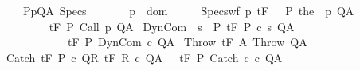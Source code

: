 \begin{isabellebody}
\ \ \ \ {\isasymforall}{\isacharparenleft}P{\isacharcomma}p{\isacharcomma}Q{\isacharcomma}A{\isacharparenright}{\isasymin}\ Specs{\isachardot}\ \isanewline
\ \ \ \ \ \ p\ {\isasymin}\ dom\ {\isasymGamma}\ {\isasymand}\ {\isacharparenleft}{\isasymforall}{\isasymsigma}{\isachardot}\ {\isasymGamma}{\isacharcomma}{\isasymTheta}\ {\isasymunion}\ Specs{\isacharunderscore}wf\ p\ {\isasymsigma}{\isasymturnstile}\isactrlsub t\isactrlbsub {\isacharslash}F\isactrlesub \ {\isacharparenleft}{\isacharbraceleft}{\isasymsigma}{\isacharbraceright}\ {\isasyminter}\ P{\isacharparenright}\ {\isacharparenleft}the\ {\isacharparenleft}{\isasymGamma}\ p{\isacharparenright}{\isacharparenright}\ Q{\isacharcomma}A{\isacharparenright}\isanewline
\ \ \ \ {\isasymrbrakk}\isanewline
\ \ \ \ {\isasymLongrightarrow}\isanewline
\ \ \ \ {\isasymGamma}{\isacharcomma}{\isasymTheta}{\isasymturnstile}\isactrlsub t\isactrlbsub {\isacharslash}F\isactrlesub \ P\ {\isacharparenleft}Call\ p{\isacharparenright}\ Q{\isacharcomma}A{\isachardoublequoteclose}\isanewline
\isanewline
\isanewline
{\isacharbar}\ DynCom{\isacharcolon}\ \ {\isachardoublequoteopen}{\isasymforall}s\ {\isasymin}\ P{\isachardot}\ {\isasymGamma}{\isacharcomma}{\isasymTheta}{\isasymturnstile}\isactrlsub t\isactrlbsub {\isacharslash}F\isactrlesub \ P\ {\isacharparenleft}c\ s{\isacharparenright}\ Q{\isacharcomma}A\ \isanewline
\ \ \ \ \ \ \ \ \ \ \ \ {\isasymLongrightarrow}\ \isanewline
\ \ \ \ \ \ \ \ \ \ \ \ {\isasymGamma}{\isacharcomma}{\isasymTheta}{\isasymturnstile}\isactrlsub t\isactrlbsub {\isacharslash}F\isactrlesub \ P\ {\isacharparenleft}DynCom\ c{\isacharparenright}\ Q{\isacharcomma}A{\isachardoublequoteclose}\isanewline
\isanewline
\isanewline
{\isacharbar}\ Throw{\isacharcolon}\ {\isachardoublequoteopen}{\isasymGamma}{\isacharcomma}{\isasymTheta}{\isasymturnstile}\isactrlsub t\isactrlbsub {\isacharslash}F\isactrlesub \ A\ Throw\ Q{\isacharcomma}A{\isachardoublequoteclose}\isanewline
\isanewline
{\isacharbar}\ Catch{\isacharcolon}\ {\isachardoublequoteopen}{\isasymlbrakk}{\isasymGamma}{\isacharcomma}{\isasymTheta}{\isasymturnstile}\isactrlsub t\isactrlbsub {\isacharslash}F\isactrlesub \ P\ c\ Q{\isacharcomma}R{\isacharsemicolon}\ {\isasymGamma}{\isacharcomma}{\isasymTheta}{\isasymturnstile}\isactrlsub t\isactrlbsub {\isacharslash}F\isactrlesub \ R\ c\ Q{\isacharcomma}A{\isasymrbrakk}\ {\isasymLongrightarrow}\ \ {\isasymGamma}{\isacharcomma}{\isasymTheta}{\isasymturnstile}\isactrlsub t\isactrlbsub {\isacharslash}F\isactrlesub \ P\ Catch\ c\ c\ Q{\isacharcomma}A{\isachardoublequoteclose}\isanewline

\end{isabellebody}
